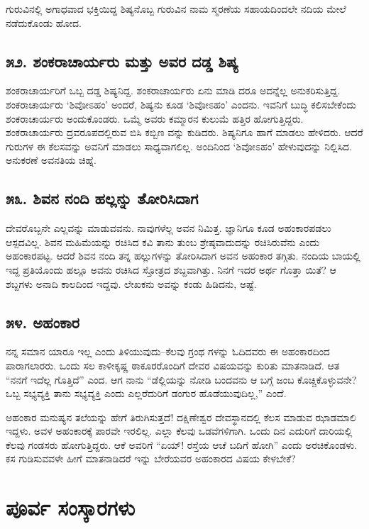 ಗುರುವಿನಲ್ಲಿ ಅಗಾಧವಾದ ಭಕ್ತಿಯಿದ್ದ ಶಿಷ್ಯನೊಬ್ಬ ಗುರುವಿನ ನಾಮ ಸ್ಮರಣೆಯ ಸಹಾಯದಿಂದಲೇ ನದಿಯ ಮೇಲೆ ನಡೆದುಕೊಂಡು ಹೋದ.



\section{\num{೫೨. } ಶಂಕರಾಚಾರ್ಯರು ಮತ್ತು ಅವರ ದಡ್ಡ ಶಿಷ್ಯ}

ಶಂಕರಾಚಾರ್ಯರಿಗೆ ಒಬ್ಬ ದಡ್ಡ ಶಿಷ್ಯನಿದ್ದ. ಶಂಕರಾಚಾರ್ಯರು ಏನು ಮಾಡಿ ದರೂ ಅದನ್ನೆಲ್ಲ ಅನುಕರಿಸುತ್ತಿದ್ದ. ಶಂಕರಾಚಾರ್ಯರು ‘ಶಿವೋಽಹಂ’ ಅಂದರೆ, ಶಿಷ್ಯನು ಕೂಡ ‘ಶಿವೋಽಹಂ’ ಎಂದನು. ಇವನಿಗೆ ಬುದ್ಧಿ ಕಲಿಸಬೇಕೆಂದು ಶಂಕರಾಚಾರ್ಯರು ಅಂದುಕೊಂಡರು. ಒಮ್ಮೆ ಅವರು ಕಮ್ಮಾರನ ಕುಲುಮೆ ಹತ್ತಿರ ಹೋಗುತ್ತಿದ್ದರು. ಶಂಕರಾಚಾರ್ಯರು ದ್ರವರೂಪದಲ್ಲಿರುವ ಬಿಸಿ ಕಬ್ಬಿಣ ವನ್ನು ಕುಡಿದರು. ಶಿಷ್ಯನಿಗೂ ಹಾಗೆ ಮಾಡಲು ಹೇಳಿದರು. ಆದರೆ ಗುರುಗಳ ಈ ಕೆಲಸವನ್ನು ಅವನಿಗೆ ಮಾಡಲು ಸಾಧ್ಯವಾಗಲಿಲ್ಲ. ಅಂದಿನಿಂದ ‘ಶಿವೋಽಹಂ’ ಹೇಳುವುದನ್ನು ನಿಲ್ಲಿಸಿದ. ಅನುಕರಣೆ ಅವನತಿಯ ಚಿಹ್ನೆ.


\section{\num{೫೩. } ಶಿವನ ನಂದಿ ಹಲ್ಲನ್ನು ತೋರಿಸಿದಾಗ}

ದೇವರೊಬ್ಬನೇ ಎಲ್ಲವನ್ನು ಮಾಡುವವನು. ನಾವುಗಳೆಲ್ಲ ಅವನ ನಿಮಿತ್ತ. ಜ್ಞಾನಿಗೂ ಕೂಡ ಅಹಂಕಾರಪಡಲು ಆಸ್ಪದವಿಲ್ಲ. ಶಿವನ ಮಹಿಮೆಯನ್ನು ರಚಿಸಿದ ಕವಿ ತಾನು ತುಂಬ ಶ್ರೇಷ್ಠವಾದುದನ್ನು ರಚಿಸಿರುವೆನು ಎಂದು ಅಹಂಕಾರಪಟ್ಟ. ಆದರೆ ಶಿವನ ನಂದಿ ತನ್ನ ಹಲ್ಲುಗಳನ್ನು ತೋರಿಸಿದಾಗ ಅವನ ಅಹಂಕಾರ ತಗ್ಗಿತು. ನಂದಿಯ ಬಾಯಲ್ಲಿ ಇದ್ದ ಪ್ರತಿಯೊಂದು ಹಲ್ಲೂ ಅವನು ರಚಿಸಿದ ಸ್ತೋತ್ರದ ಶಬ್ದವಾಗಿತ್ತು. ನಿನಗೆ ಇದರ ಅರ್ಥ ಗೊತ್ತಾ ಯಿತೆ? ಆ ಶಬ್ದಗಳು ಅನಾದಿ ಕಾಲದಿಂದ ಇದ್ದವು. ಲೇಖಕನು ಅವನ್ನು ಕಂಡು ಹಿಡಿದನು, ಅಷ್ಟೆ.


\section{\num{೫೪. } ಅಹಂಕಾರ}

ನನ್ನ ಸಮಾನ ಯಾರೂ ಇಲ್ಲ ಎಂದು ತಿಳಿಯುವುದು–ಕೆಲವು ಗ್ರಂಥ ಗಳನ್ನು ಓದಿದವರು ಈ ಅಹಂಕಾರದಿಂದ ಪಾರಾಗಲಾರರು. ಒಂದು ಸಲ ಕಾಳೀಕೃಷ್ಣ ಠಾಕೂರರೊಂದಿಗೆ ದೇವರ ವಿಷಯವನ್ನು ಕುರಿತು ಮಾತನಾಡಿದೆ. ಆತ “ನನಗೆ ಇದೆಲ್ಲ ಗೊತ್ತಿದೆ” ಎಂದ. ಆಗ ನಾನು “ಡೆಲ್ಲಿಯನ್ನು ನೋಡಿ ಬಂದವನು ಆ ಬಗ್ಗೆ ಜಂಬ ಕೊಚ್ಚಿಕೊಳ್ಳುವನೇ? ಒಬ್ಬ ಸಭ್ಯವ್ಯಕ್ತಿ ತಾನು ಸಭ್ಯವ್ಯಕ್ತಿ ಎಂದು ಎಲ್ಲರೆದುರಿಗೆ ಡಂಗುರ ಹೊಡೆಯುವುದಿಲ್ಲ,” ಎಂದೆ.

ಅಹಂಕಾರ ಮನುಷ್ಯನ ತಲೆಯನ್ನು ಹೇಗೆ ತಿರುಗಿಸುತ್ತದೆ! ದಕ್ಷಿಣೇಶ್ವರ ದೇವಸ್ಥಾನದಲ್ಲಿ ಕೆಲಸ ಮಾಡುವ ಝಾಡಮಾಲಿ ಇದ್ದಳು. ಅವಳ ಅಹಂಕಾರಕ್ಕೆ ಪಾರವೇ ಇರಲಿಲ್ಲ. ಎಲ್ಲಾ ಕೆಲವು ಒಡವೆಗಳಿಗಾಗಿ. ಒಂದು ದಿನ ಎದುರಿಗೆ ದಾರಿಯಲ್ಲಿ ಕೆಲವು ಗಂಡಸರು ಹೋಗುತ್ತಿದ್ದರು. ಆಕೆ ಅವರಿಗೆ “ಏಯ್! ರಸ್ತೆಯ ಆಚೆ ಬದಿಗೆ ಹೋಗಿ” ಎಂದು ಅರಚಿಕೊಂಡಳು. ಕಸ ಗುಡಿಸುವವಳೇ ಹೀಗೆ ಮಾತನಾಡಿದರೆ ಇನ್ನು ಬೇರೆಯವರ ಅಹಂಕಾರದ ವಿಷಯ ಕೇಳಬೇಕೆ?

\chapter{ಪೂರ್ವ ಸಂಸ್ಕಾರಗಳು}

